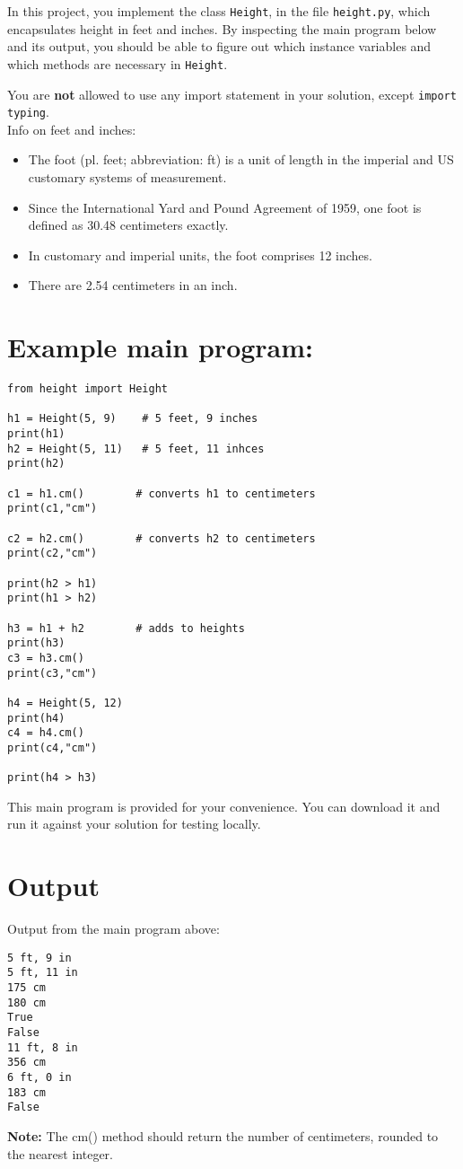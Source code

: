 
In this project, you implement the class \texttt{Height}, in the file \texttt{height.py}, which encapsulates height in feet and inches. 
By inspecting the main program below and its output, you should be able to figure out which instance variables and which methods are necessary in \texttt{Height}. 

You are \textbf{not} allowed to use any import statement in your solution, except \texttt{import typing}. \\

\noindent
Info on feet and inches:
\begin{itemize}
\item The foot (pl. feet; abbreviation: ft) is a unit of length in the imperial and US customary systems of measurement.
\item Since the International Yard and Pound Agreement of 1959, one foot is defined as 30.48 centimeters exactly.
\item In customary and imperial units, the foot comprises 12 inches. 
\item There are 2.54 centimeters in an inch.
\end{itemize}


\section*{Example main program:}

\begin{verbatim}
from height import Height

h1 = Height(5, 9)    # 5 feet, 9 inches
print(h1)
h2 = Height(5, 11)   # 5 feet, 11 inhces
print(h2)

c1 = h1.cm()        # converts h1 to centimeters
print(c1,"cm")

c2 = h2.cm()        # converts h2 to centimeters
print(c2,"cm")

print(h2 > h1)      
print(h1 > h2)

h3 = h1 + h2        # adds to heights
print(h3)
c3 = h3.cm()
print(c3,"cm")

h4 = Height(5, 12)
print(h4)
c4 = h4.cm()
print(c4,"cm")

print(h4 > h3)
\end{verbatim}

This main program is provided for your convenience.
You can download it and run it against your solution for testing locally.


\pagebreak
\section*{Output}
\noindent
Output from the main program above:
\begin{verbatim}
5 ft, 9 in
5 ft, 11 in
175 cm
180 cm
True
False
11 ft, 8 in
356 cm
6 ft, 0 in
183 cm
False
\end{verbatim}
\textbf{Note:} The cm() method should return the number of centimeters, rounded to the nearest integer.

